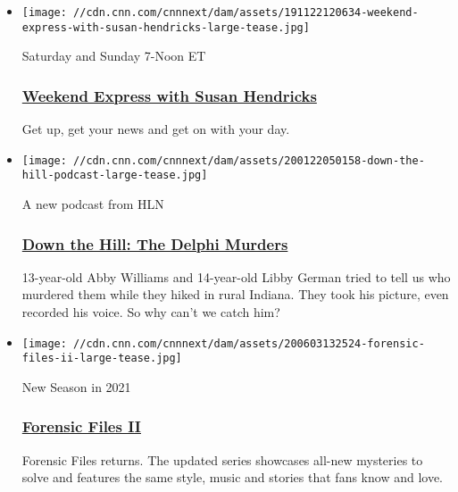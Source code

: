 \begin{itemize}
\item
  \href{/shows/weekend-express}{}

  \texttt{[image: //cdn.cnn.com/cnnnext/dam/assets/191122120634-weekend-express-with-susan-hendricks-large-tease.jpg]}

  Saturday and Sunday 7-Noon ET

  \hypertarget{weekend-express-with-susan-hendricks}{%
  \subsubsection{\texorpdfstring{\href{/shows/weekend-express}{Weekend
  Express with Susan
  Hendricks}}{Weekend Express with Susan Hendricks}}\label{weekend-express-with-susan-hendricks}}

  Get up, get your news and get on with your day.
\end{itemize}

\begin{itemize}
\item
  \href{http://www.downthehillpodcast.com}{}

  \texttt{[image: //cdn.cnn.com/cnnnext/dam/assets/200122050158-down-the-hill-podcast-large-tease.jpg]}

  A new podcast from HLN

  \hypertarget{down-the-hill-the-delphi-murders}{%
  \subsubsection{\texorpdfstring{\href{http://www.downthehillpodcast.com}{Down
  the Hill: The Delphi
  Murders}}{Down the Hill: The Delphi Murders}}\label{down-the-hill-the-delphi-murders}}

  13-year-old Abby Williams and 14-year-old Libby German tried to tell
  us who murdered them while they hiked in rural Indiana. They took his
  picture, even recorded his voice. So why can't we catch him?
\end{itemize}

\begin{itemize}
\item
  \href{https://cnnpressroom.blogs.cnn.com/2020/05/12/forensic-files-ii-hlns-highest-rated-original-series-ever-is-renewed-for-two-seasons-with-32-episodes/}{}

  \texttt{[image: //cdn.cnn.com/cnnnext/dam/assets/200603132524-forensic-files-ii-large-tease.jpg]}

  New Season in 2021

  \hypertarget{forensic-files-ii}{%
  \subsubsection{\texorpdfstring{\href{https://cnnpressroom.blogs.cnn.com/2020/05/12/forensic-files-ii-hlns-highest-rated-original-series-ever-is-renewed-for-two-seasons-with-32-episodes/}{Forensic
  Files II}}{Forensic Files II}}\label{forensic-files-ii}}

  Forensic Files returns. The updated series showcases all-new mysteries
  to solve and features the same style, music and stories that fans know
  and love.
\end{itemize}

